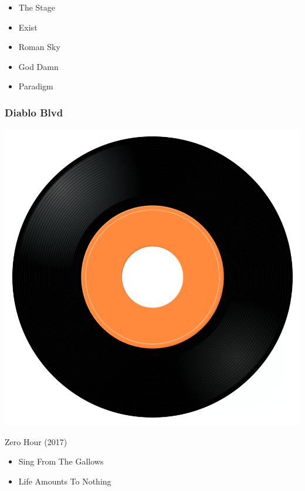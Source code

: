 \begin{minipage}[t]{0.25\textwidth}\vspace{0pt}
\begin{itemize}[nosep,leftmargin=1em,labelwidth=*,align=left]
	\setlength{\itemsep}{0pt}
	\item The Stage
	\item Exist
	\item Roman Sky
	\item God Damn
	\item Paradigm
\end{itemize}
\end{minipage}

\subsubsection{Diablo Blvd}

\begin{minipage}[t]{0.25\textwidth}\vspace{0pt}
\captionsetup{type=figure}
\includegraphics[width=\textwidth]{Images/cover.png}
\caption*{Zero Hour (2017)}
\end{minipage}
\begin{minipage}[t]{0.25\textwidth}\vspace{0pt}
\begin{itemize}[nosep,leftmargin=1em,labelwidth=*,align=left]
	\setlength{\itemsep}{0pt}
	\item Sing From The Gallows
	\item Life Amounts To Nothing
\end{itemize}
\end{minipage}

